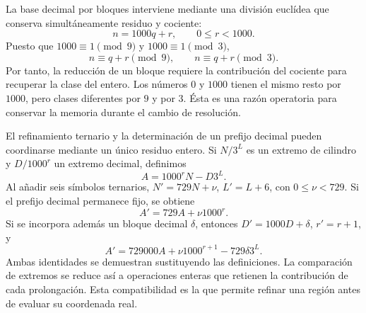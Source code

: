 La base decimal por bloques interviene mediante una división euclídea
que conserva simultáneamente residuo y cociente:
\[
 n=1000q+r,\qquad 0\le r<1000.
\]
Puesto que \(1000\equiv1\pmod9\) y \(1000\equiv1\pmod3\),
\[
 n\equiv q+r\pmod9,\qquad n\equiv q+r\pmod3.
\]
Por tanto, la reducción de un bloque requiere la contribución del
cociente para recuperar la clase del entero. Los números \(0\) y
\(1000\) tienen el mismo resto por \(1000\), pero clases diferentes
por \(9\) y por \(3\). Ésta es una razón operatoria para conservar
la memoria durante el cambio de resolución.

El refinamiento ternario y la determinación de un prefijo decimal
pueden coordinarse mediante un único residuo entero. Si \(N/3^L\)
es un extremo de cilindro y \(D/1000^r\) un extremo decimal, definimos
\[
 A=1000^rN-D3^L.
\]
Al añadir seis símbolos ternarios, \(N'=729N+\nu\),
\(L'=L+6\), con \(0\le\nu<729\). Si el prefijo decimal permanece
fijo, se obtiene
\[
 A'=729A+\nu1000^r.
\]
Si se incorpora además un bloque decimal \(\delta\), entonces
\(D'=1000D+\delta\), \(r'=r+1\), y
\begin{equation}
 A'=729000A+\nu1000^{r+1}-729\delta3^L.
 \label{eq:residuo-dos-bases}
\end{equation}
Ambas identidades se demuestran sustituyendo las definiciones. La
comparación de extremos se reduce así a operaciones enteras que
retienen la contribución de cada prolongación. Esta compatibilidad
es la que permite refinar una región antes de evaluar su coordenada real.

